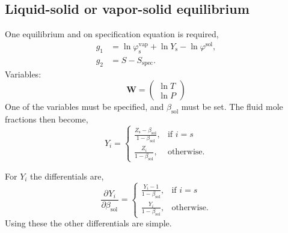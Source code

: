 \documentclass[english]{../thermomemo/thermomemo}
\newcommand*{\pd}[3][]{\frac{\partial^{#1}#2}{\partial{#3}^{#1}}}%
\newcommand*{\vektor}[1]{\boldsymbol{#1}}%
\newcommand{\spec}{\text{spec}}
\newcommand{\sol}{\text{sol}}
\newcommand{\vap}{\text{vap}}
\newcommand{\scomp}{\text{s}\xspace}
\begin{document}
\subsection{Liquid-solid or vapor-solid equilibrium}
One equilibrium and on specification equation is required,
\begin{align}
   g_{1} &= \ln \varphi^\vap_\scomp + \ln Y_\scomp - \ln \varphi^\sol,\\
   g_{2} &= S - S_\spec \label{eq:spec_eq_ls}.
\end{align}
Variables:
\begin{equation}
  \label{eq:W_ls}
  \vektor{W} = \begin{pmatrix}
    \ln T \\
    \ln P
  \end{pmatrix}
\end{equation}
One of the variables must be specified, and $\beta_\sol$ must be set. The fluid mole fractions then become,
\begin{equation}
  Y_i = \begin{cases}
    \frac{Z_\scomp - \beta_\sol}{1-\beta_\sol}, & \text{if } i = s\\
    \frac{Z_i}{1-\beta_\sol}, & \text{otherwise}.
  \end{cases}
\end{equation}

For $Y_i$ the differentials are,
\begin{equation}
  \pd{Y_i}{\beta_\sol} = \begin{cases}
    \frac{Y_i - 1}{1-\beta_\sol}, & \text{if } i = s\\
    \frac{Y_i}{1-\beta_\sol}, & \text{otherwise}.
  \end{cases}
\end{equation}
Using these the other differentials are simple.
\end{document}
